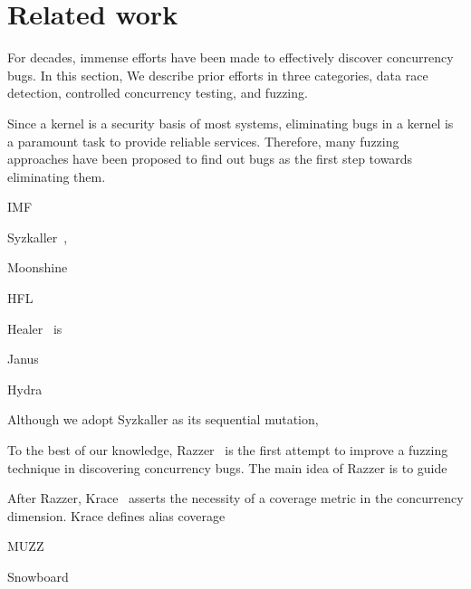 \section{Related work}
\label{s:relwk}

For decades, immense efforts have been made to effectively discover
concurrency bugs. In this section, We describe prior efforts in three
categories, data race detection, controlled concurrency testing, and
fuzzing.





%
Since a kernel is a security basis of most systems, eliminating bugs
in a kernel is a paramount task to provide reliable
services. Therefore, many fuzzing approaches have been proposed to
find out bugs as the first step towards eliminating them.
%

IMF~\cite{imf}

Syzkaller~\cite{syzkaller},

Moonshine~\cite{moonshine}

HFL~\cite{hfl}

Healer~\cite{healer} is

Janus~\cite{janus}

Hydra~\cite{hydra}


Although we adopt Syzkaller as its sequential mutation, 

%
To the best of our knowledge, Razzer~\cite{razzer} is the first
attempt to improve a fuzzing technique in discovering concurrency
bugs.
%
The main idea of Razzer is to guide


After Razzer, Krace~\cite{krace} asserts the necessity of a coverage
metric in the concurrency dimension. Krace defines alias coverage


MUZZ~\cite{muzz}


Snowboard~\cite{snowboard}



